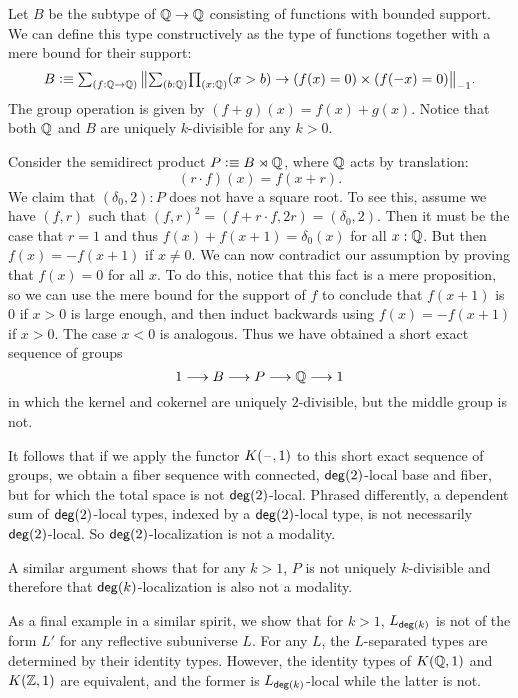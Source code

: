 \begin{eg}\label{example:nonlocalfib}
    Let $B$ be the subtype of $\mathbb{Q} \to \mathbb{Q}$ consisting of functions with bounded support.
    We can define this type constructively as the type of functions together with
    a mere bound for their support:
    \[
         B \defeq \sm{f : \Q \to \Q} \, \ttrunc{-1}{\sm{b : \Q} \prd{x : \Q} (x > b) \to (f(x) = 0) \times (f(-x) = 0)}.
    \]
    The group operation is given by $(f + g)(x) = f(x) + g(x)$.
    Notice that both $\mathbb{Q}$ and $B$ are uniquely $k$-divisible for any $k > 0$.

    Consider the semidirect product $P \vcentcolon\equiv B \rtimes \mathbb{Q}$, where $\mathbb{Q}$ acts by translation:
    \[
        (r \cdot f)(x) = f(x+r).
    \]
    We claim that $(\delta_0, 2) : P$ does not have a square root. To see
    this, assume we have $(f,r)$ such that $(f,r)^2 = (f + r\cdot f,2r) = (\delta_0, 2)$.
    Then it must be the case that $r = 1$ and thus $f(x) + f(x+1) = \delta_0(x)$ for all $x : \mathbb{Q}$.
    But then $f(x) = - f(x+1)$ if $x \neq 0$.
    We can now contradict our assumption by proving that $f(x) = 0$ for all $x$.
    To do this, notice that this fact is a mere proposition, so we
    can use the mere bound for the support of $f$ to conclude that $f(x+1)$ is $0$ if $x>0$ is large enough,
    and then induct backwards using $f(x) = - f(x+1)$ if $x>0$. The case $x<0$ is analogous.
    Thus we have obtained a short exact sequence of groups
    \[
        1 \longrightarrow B \longrightarrow P \longrightarrow \mathbb{Q} \longrightarrow 1
    \]
    in which the kernel and cokernel are uniquely $2$-divisible, but the middle group is not.

    It follows that if we apply the functor $K(\mathord{\hspace{1pt}\text{--}\hspace{1pt}}, 1)$ to this short exact sequence of groups,
    we obtain a fiber sequence with connected, $\mathsf{deg}(2)$-local base and fiber,
    but for which the total space is not $\mathsf{deg}(2)$-local.
    Phrased differently, a dependent sum of $\mathsf{deg}(2)$-local types, indexed by 
    a $\mathsf{deg}(2)$-local type, is not necessarily $\mathsf{deg}(2)$-local.
    So $\mathsf{deg}(2)$-localization is not a modality.

    A similar argument shows that for any $k > 1$, $P$ is not uniquely $k$-divisible
    and therefore that $\mathsf{deg}(k)$-localization is also not a modality.
\end{eg}

\begin{eg}
As a final example in a similar spirit, we show that for $k > 1$, $L_{\mathsf{deg}(k)}$ is not
of the form $L'$ for any reflective subuniverse $L$.
For any $L$, the $L$-separated types are determined by their identity types.
However, the identity types of $K(\mathbb{Q},1)$ and $K(\mathbb{Z},1)$ are equivalent,
and the former is $L_{\mathsf{deg}(k)}$-local while the latter is not.
\end{eg}

